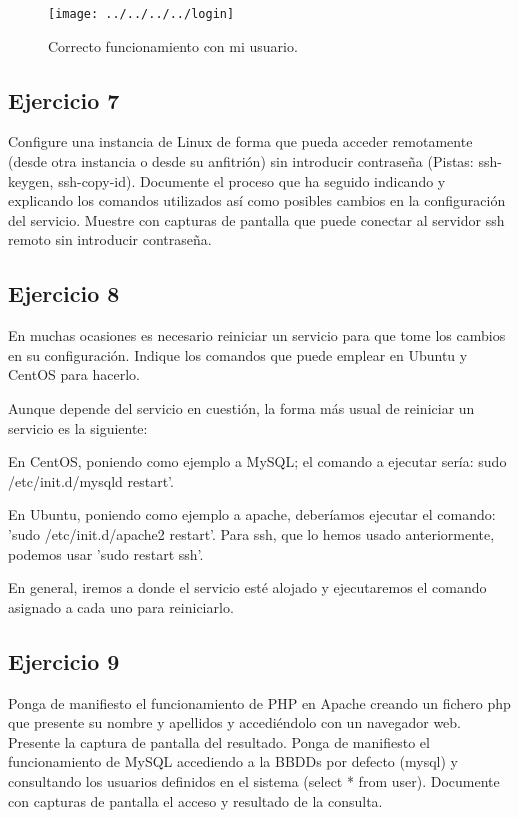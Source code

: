 \documentclass[a4paper, 11pt]{article} %
\begin{document}
\pagebreak 

\begin{figure}[htpb]
\texttt{[image: ../../../../login]}
\caption{Correcto funcionamiento con mi usuario.}
\end{figure}


\subsection{Ejercicio 7}
Configure una instancia de Linux de forma que pueda acceder remotamente (desde otra instancia o desde su anfitrión) sin introducir contraseña (Pistas: ssh-keygen, ssh-copy-id). Documente el proceso que ha seguido indicando y explicando los comandos utilizados así como posibles cambios en la configuración del servicio. Muestre con capturas de pantalla que puede conectar al servidor ssh remoto sin introducir contraseña.


\subsection{Ejercicio 8}
En muchas ocasiones es necesario reiniciar un servicio para que tome los cambios en su configuración. Indique los comandos que puede emplear en Ubuntu y CentOS para hacerlo.

Aunque depende del servicio en cuestión, la forma más usual de reiniciar un servicio es la siguiente: 

En CentOS, poniendo como ejemplo a MySQL; el comando a ejecutar sería: sudo /etc/init.d/mysqld restart'. 

En Ubuntu, poniendo como ejemplo a apache, deberíamos ejecutar el comando: 'sudo /etc/init.d/apache2 restart'. Para ssh, que lo hemos usado anteriormente, podemos usar 'sudo restart ssh'. 

En general, iremos a donde el servicio esté alojado y ejecutaremos el comando asignado a cada uno para reiniciarlo. 

\subsection{Ejercicio 9}
Ponga de manifiesto el funcionamiento de PHP en Apache creando un fichero php que presente su nombre y apellidos y accediéndolo con un navegador web. Presente la captura de pantalla del resultado. Ponga de manifiesto el funcionamiento de MySQL accediendo a la BBDDs por defecto (mysql) y consultando los usuarios definidos en el sistema (select * from user). Documente con capturas de pantalla el acceso y resultado de la consulta.
\end{document}
